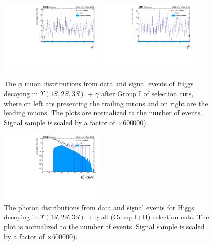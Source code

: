 \begin{figure}[!htbp]
\begin{center}
\includegraphics[width=0.45\textwidth]{figures/outputPlots/HtoUpsilon_Cat0_ZZZZZ/nEvts/data_x_mc/withKinCuts/h_withKin_TrailingMu_phi}\hspace*{1.cm}
\includegraphics[width=0.45\textwidth]{figures/outputPlots/HtoUpsilon_Cat0_ZZZZZ/nEvts/data_x_mc/withKinCuts/h_withKin_LeadingMu_phi}
\end{center}\vspace*{-.5cm}
\caption{The $\phi$ muon distributions from data and signal events of Higgs decaying in $\Upsilon(1S,2S,3S)$ + $\gamma$ after Group I of selection cuts, where on left are presenting the trailing muons and on right are the leading muons. The plots are normalized to the number of events. Signal sample is scaled by a factor of $\times 600000$).}
\label{fig:phiMuons_HtoUpsilon_Cat0_groupI_plus_II}
\end{figure}


\begin{figure}[!htbp]
\begin{center}
\includegraphics[width=0.45\textwidth]{figures/outputPlots/HtoUpsilon_Cat0_ZZZZZ/nEvts/data_x_mc/withKinCuts/h_withKin_Photon_pt}\hspace*{1.cm}
\end{center}\vspace*{-.5cm}
\caption{The \PT photon distributions from data and signal events for Higgs decaying in $\Upsilon(1S,2S,3S)$ + $\gamma$ all (Group I+II) selection cuts. The plot is normalized to the number of events. Signal sample is scaled by a factor of $\times 600000$).}
\label{fig:pTPhoton_HtoUpsilon_Cat0_groupI_plus_II}
\end{figure}


